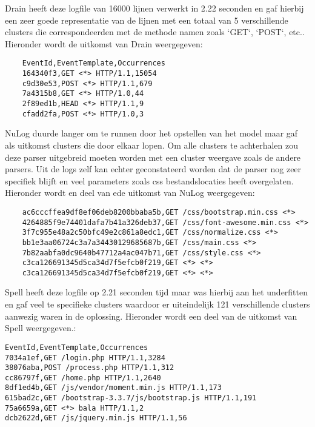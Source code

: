Drain heeft deze logfile van 16000 lijnen verwerkt in 2.22 seconden en gaf hierbij een zeer goede representatie van de lijnen met een totaal van 5 verschillende clusters die correspondeerden met de methode namen zoals `GET`, `POST`, etc.. Hieronder wordt de uitkomst van Drain weergegeven:
\begin{verbatim}
    EventId,EventTemplate,Occurrences
    164340f3,GET <*> HTTP/1.1,15054
    c9d30e53,POST <*> HTTP/1.1,679
    7a4315b8,GET <*> HTTP/1.0,44
    2f89ed1b,HEAD <*> HTTP/1.1,9
    cfadd2fa,POST <*> HTTP/1.0,3
\end{verbatim}

NuLog duurde langer om te runnen door het opstellen van het model maar gaf als uitkomst clusters die door elkaar lopen. Om alle clusters te achterhalen zou deze parser uitgebreid moeten worden met een cluster weergave zoals de andere parsers. Uit de logs zelf kan echter geconstateerd worden dat de parser nog zeer specifiek blijft en veel parameters zoals css bestandslocaties heeft overgelaten. Hieronder wordt en deel van ede uitkomst van NuLog weergegeven:
\begin{verbatim}
    ac6cccffea9df8ef06deb8200bbaba5b,GET /css/bootstrap.min.css <*>
    4264885f9e74401dafa7b41a326deb37,GET /css/font-awesome.min.css <*>
    3f7c955e48a2c50bfc49e2c861a8edc1,GET /css/normalize.css <*>
    bb1e3aa06724c3a7a34430129685687b,GET /css/main.css <*>
    7b82aabfa0dc9640b47712a4ac047b71,GET /css/style.css <*>
    c3ca126691345d5ca34d7f5efcb0f219,GET <*> <*>
    c3ca126691345d5ca34d7f5efcb0f219,GET <*> <*>
\end{verbatim}

Spell heeft deze logfile op 2.21 seconden tijd maar was hierbij aan het underfitten en gaf veel te specifieke clusters waardoor er uiteindelijk 121 verschillende clusters aanwezig waren in de oplossing. Hieronder wordt een deel van de uitkomst van Spell weergegeven.:
\begin{verbatim}
EventId,EventTemplate,Occurrences
7034a1ef,GET /login.php HTTP/1.1,3284
38076aba,POST /process.php HTTP/1.1,312
cc86797f,GET /home.php HTTP/1.1,2640
8df1ed4b,GET /js/vendor/moment.min.js HTTP/1.1,173
615bad2c,GET /bootstrap-3.3.7/js/bootstrap.js HTTP/1.1,191
75a6659a,GET <*> bala HTTP/1.1,2
dcb2622d,GET /js/jquery.min.js HTTP/1.1,56
\end{verbatim}